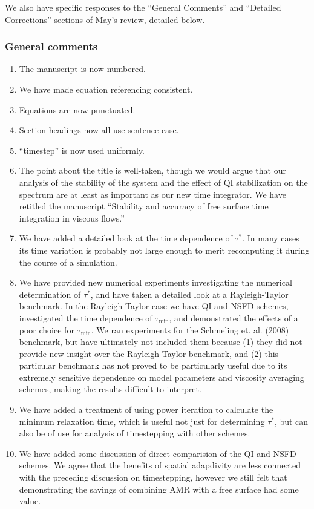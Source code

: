 \documentclass[a4paper,12pt]{article}
\begin{document}
We also have specific responses to the ``General Comments'' and ``Detailed Corrections'' sections of
May's review, detailed below.

\subsubsection*{General comments}
\begin{enumerate}
  \item The manuscript is now numbered.
  \item We have made equation referencing consistent.
  \item Equations are now punctuated.
  \item Section headings now all use sentence case.
  \item ``timestep'' is now used uniformly.
  \item The point about the title is well-taken, though we would argue that our analysis of the stability of the
system and the effect of QI stabilization on the spectrum are at least as important as our new time integrator.
We have retitled the manuscript ``Stability and accuracy of free surface time integration in viscous flows.''
  \item We have added a detailed look at the time dependence of $\tau^*$. In many cases its time variation is
probably not large enough to merit recomputing it during the course of a simulation.
  \item We have provided new numerical experiments investigating the numerical determination of $\tau^*$, and have
taken a detailed look at a Rayleigh-Taylor benchmark. In the Rayleigh-Taylor case we have QI and NSFD schemes,
investigated the time dependence of $\tau_\mathrm{min}$, and demonstrated the effects of a poor choice for $\tau_\mathrm{min}$.
We ran experiments for the Schmeling et. al. (2008) benchmark, but have ultimately not included them because 
(1) they did not provide new insight over the Rayleigh-Taylor benchmark, and 
(2) this particular benchmark has not proved to be particularly useful due to its extremely sensitive dependence 
on model parameters and viscosity averaging schemes, making the results difficult to interpret.
  \item We have added a treatment of using power iteration to calculate the minimum relaxation time, which is
useful not just for determining $\tau^*$, but can also be of use for analysis of timestepping with other schemes.
  \item We have added some discussion of direct comparision of the QI and NSFD schemes. We agree that the benefits
    of spatial adapdivity are less connected with the preceding discussion on timestepping, however we still felt
    that demonstrating the savings of combining AMR with a free surface had some value.
\end{enumerate}
\end{document}
